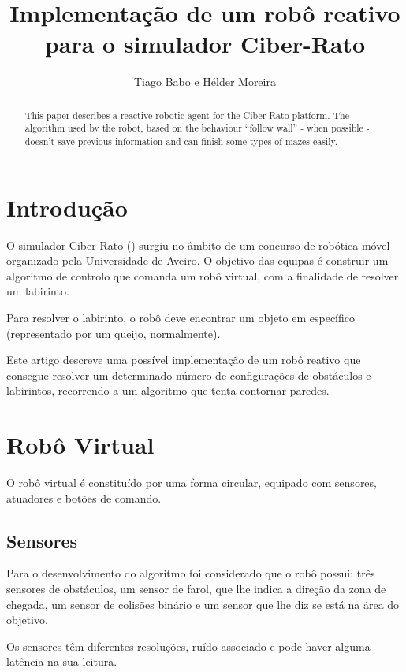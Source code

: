 \documentclass[citeauthoryear]{llncs} %
\begin{document}
\title{Implementação de um robô reativo para o simulador Ciber-Rato}
\author{Tiago Babo e Hélder Moreira}


\maketitle

\begin{abstract}
This paper describes a reactive robotic agent for the Ciber-Rato platform. The algorithm used by the robot, based on the behaviour “follow wall” - when possible - doesn't save previous information and can finish some types of mazes easily.
\end{abstract}

\section{Introdução}
O simulador Ciber-Rato (\cite{microrato}) surgiu no âmbito de um concurso de robótica móvel organizado pela Universidade de Aveiro. O objetivo das equipas é construir um algoritmo de controlo que comanda um robô virtual, com a finalidade de resolver um labirinto. 

Para resolver o labirinto, o robô deve encontrar um objeto em específico (representado por um queijo, normalmente).

Este artigo descreve uma possível implementação de um robô reativo que consegue resolver um determinado número de configurações de obstáculos e labirintos, recorrendo a um algoritmo que tenta contornar paredes. 

\section{Robô Virtual}

O robô virtual é constituído por uma forma circular, equipado com sensores, atuadores e botões de comando. 

\subsection{Sensores}
Para o desenvolvimento do algoritmo foi considerado que o robô possui: três sensores de obstáculos, um sensor de farol, que lhe indica a direção da zona de chegada, um sensor de colisões binário e um sensor que lhe diz se está na área do objetivo. 

Os sensores têm diferentes resoluções, ruído associado e pode haver alguma latência na sua leitura.
\end{document}
